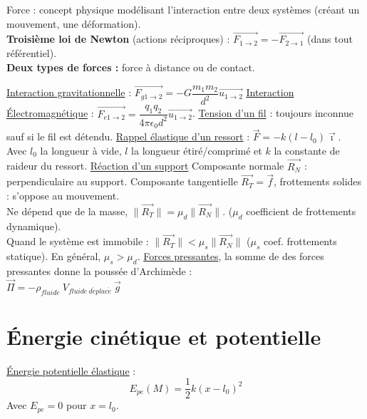 \documentclass[13pt, twoside, a4paper, french]{report}
\begin{document}
      Force : concept physique modélisant l'interaction entre deux systèmes (créant un mouvement, une déformation).\\
      
      \textbf{Troisième loi de Newton} (actions réciproques) : $\overrightarrow{F_{1\rightarrow2}} = - \overrightarrow{F_{2\rightarrow1}}$ (dans tout référentiel).\\
      
      \textbf{Deux types de forces :} force à distance ou de contact.
      \begin{outline}
        \1 \underline{Interaction gravitationnelle} : $\overrightarrow{F_{g1\rightarrow2}} = - G\dfrac{m_1 m_2}{d^2}\overrightarrow{u_{1\rightarrow2}}$
        \1 \underline{Interaction Électromagnétique} : $\overrightarrow{F_{e1\rightarrow2}} = \dfrac{q_1 q_2}{4\pi\epsilon_0 d^2}\overrightarrow{u_{1\rightarrow2}}$.
        \1 \underline{Tension d'un fil} : toujours inconnue sauf si le fil est détendu.
        \1 \underline{Rappel élastique d'un ressort} : $\vec{F} = - k (l - l_0)\vec{\imath}$.\\Avec $l_0$ la longueur à vide, $l$ la longueur étiré/comprimé et $k$ la constante de raideur du ressort.
        \1 \underline{Réaction d'un support}
        \2 Composante normale $\overrightarrow{R_N}$ : perpendiculaire au support.
        \2 Composante tangentielle $\overrightarrow{R_T} = \overrightarrow{f}$, frottements solides : s'oppose au mouvement.\\Ne dépend que de la masse, $\|\overrightarrow{R_T}\| = \mu_d \|\overrightarrow{R_N}\|$. ($\mu_d$ coefficient de frottements dynamique).\\Quand le système est immobile : $\|\overrightarrow{R_T}\| < \mu_s \|\overrightarrow{R_N}\|$ ($\mu_s$ coef. frottements statique). En général, $\mu_s > \mu_d$.
        \1 \underline{Forces pressantes}, la somme de des forces pressantes donne la poussée d'Archimède :
        \\$\overrightarrow{\Pi} = - \rho_{fluide}\ V_{fluide \ d\acute eplac\acute e}\ \vec{g}$
      \end{outline}
  
  
  \section{Énergie cinétique et potentielle}\label{sec:energie-cinetique-et-potentielle}
    
    \underline{Énergie potentielle élastique} : \[\displaystyle E_{pe}(M) = \dfrac{1}{2} k (x - l_0)^2\]
    Avec $E_{pe} = 0$ pour $x = l_0$.
  
\end{document}

